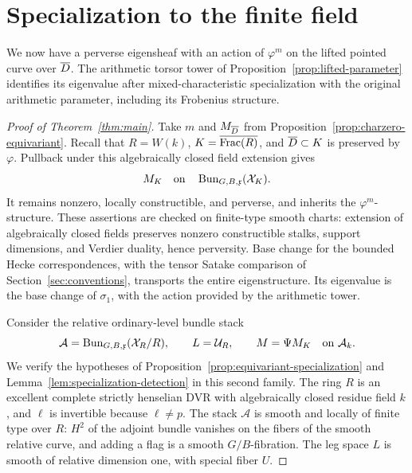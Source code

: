 \section{Specialization to the finite field}
\label{sec:final}

We now have a perverse eigensheaf with an action of $\varphi^m$ on
the lifted pointed curve over $\overline D$.  The arithmetic torsor tower
of Proposition~\ref{prop:lifted-parameter} identifies its eigenvalue
after mixed-characteristic specialization with the original
arithmetic parameter, including its Frobenius structure.

\begin{proof}[Proof of Theorem~\ref{thm:main}]
Take $m$ and $M_{\overline D}$ from
Proposition~\ref{prop:charzero-equivariant}.  Recall that
$R=W(k)$, $K=\overline{\operatorname{Frac}(R)}$, and $\overline D\subset K$ is
preserved by $\varphi$.  Pullback under this algebraically closed
field extension gives
\[
 M_K\quad\text{on}\quad
 \operatorname{Bun}_{G,B,\mathfrak x}(\mathcal X_K).
\]
It remains nonzero, locally constructible, and perverse, and
inherits the $\varphi^m$-structure.  These assertions are checked
on finite-type smooth charts: extension of algebraically closed
fields preserves nonzero constructible stalks, support dimensions,
and Verdier duality, hence perversity.  Base change for the bounded
Hecke correspondences, with the tensor Satake comparison of
Section~\ref{sec:conventions}, transports the entire eigenstructure.
Its eigenvalue is the base change of $\sigma_1$, with the action
provided by the arithmetic tower.

Consider the relative ordinary-level bundle stack
\begin{equation}\label{eq:final-relative-stack}
 \mathcal A=
 \operatorname{Bun}_{G,B,\mathfrak x}(\mathcal X_R/R),
 \qquad L=\mathcal U_R,
 \qquad M=\Psi M_K\quad\text{on }\mathcal A_k.
\end{equation}
We verify the hypotheses of
Proposition~\ref{prop:equivariant-specialization} and
Lemma~\ref{lem:specialization-detection} in this second family.
The ring $R$ is an excellent complete strictly henselian DVR with
algebraically closed residue field $k$, and $\ell$ is invertible
because $\ell\ne p$.  The stack $\mathscr A$ is smooth and locally
of finite type over $R$: $H^2$ of the adjoint bundle vanishes on
the fibers of the smooth relative curve, and adding a flag is a
smooth $G/B$-fibration.  The leg space $L$ is smooth of relative
dimension one, with special fiber $U$.


\end{proof}
